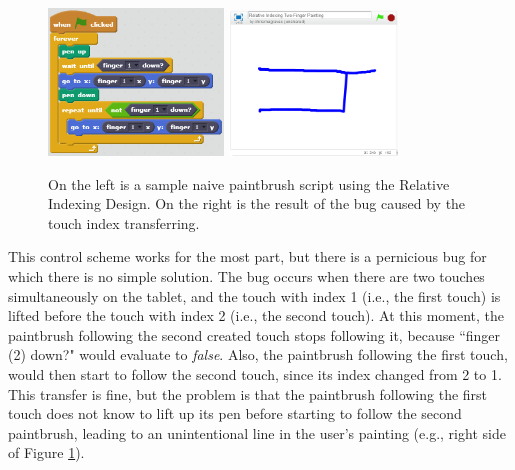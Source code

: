 \begin{figure}
\centering
\includegraphics[width=0.415\textwidth]{images/NaiveTwoFingerPaintingRID.PNG}
\includegraphics[width=0.4\textwidth]{images/IndexTransferLineBug.PNG}
\caption[Sample Naive Script for Two-Finger Painting Using the Relative Indexing Design ]{On the left is a sample naive paintbrush script using the Relative Indexing Design. On the right is the result of the bug caused by the touch index transferring.}
\label{NaiveTwoFingerPaintingRID}
\end{figure}

This control scheme works for the most part, but there is a pernicious bug for which there is no simple solution. The bug occurs when there are two touches simultaneously on the tablet, and the touch with index 1 (i.e., the first touch) is lifted before the touch with index 2 (i.e., the second touch). At this moment, the paintbrush following the second created touch stops following it, because ``finger (2) down?" would evaluate to \emph{false}. Also, the paintbrush following the first touch, would then start to follow the second touch, since its index changed from 2 to 1. This transfer is fine, but the problem is that the paintbrush following the first touch does not know to lift up its pen before starting to follow the second paintbrush, leading to an unintentional line in the user's painting (e.g., right side of Figure \ref{NaiveTwoFingerPaintingRID}). 

